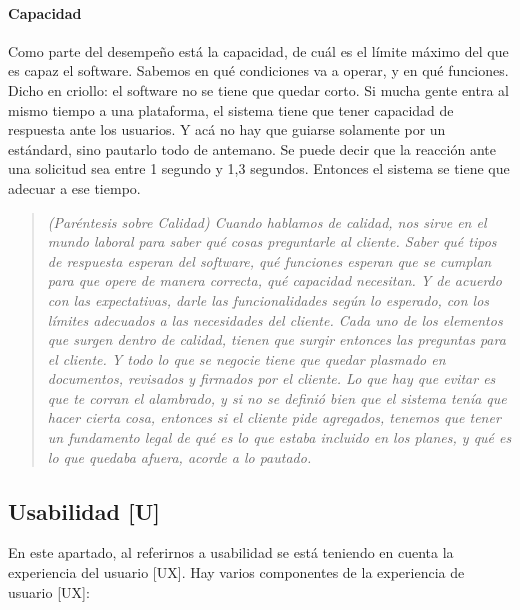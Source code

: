 \hypertarget{capacidad}{%
\paragraph{Capacidad}\label{capacidad}}

Como parte del desempeño está la capacidad, de cuál es el límite máximo
del que es capaz el software. Sabemos en qué condiciones va a operar, y
en qué funciones. Dicho en criollo: el software no se tiene que quedar
corto. Si mucha gente entra al mismo tiempo a una plataforma, el sistema
tiene que tener capacidad de respuesta ante los usuarios. Y acá no hay
que guiarse solamente por un estándard, sino pautarlo todo de antemano.
Se puede decir que la reacción ante una solicitud sea entre 1 segundo y
1,3 segundos. Entonces el sistema se tiene que adecuar a ese tiempo.

\begin{quote}
{\slshape
(Paréntesis sobre Calidad) Cuando hablamos de calidad, nos sirve en el
mundo laboral para saber qué cosas preguntarle al cliente. Saber qué
tipos de respuesta esperan del software, qué funciones esperan que se
cumplan para que opere de manera correcta, qué capacidad necesitan. Y de
acuerdo con las expectativas, darle las funcionalidades según lo
esperado, con los límites adecuados a las necesidades del cliente. Cada
uno de los elementos que surgen dentro de calidad, tienen que surgir
entonces las preguntas para el cliente. Y todo lo que se negocie tiene
que quedar plasmado en documentos, revisados y firmados por el cliente.
Lo que hay que evitar es que te corran el alambrado, y si no se definió
bien que el sistema tenía que hacer cierta cosa, entonces si el cliente
pide agregados, tenemos que tener un fundamento legal de qué es lo que
estaba incluido en los planes, y qué es lo que quedaba afuera, acorde a
lo pautado.
}
\end{quote}

\hypertarget{usabilidad-u}{%
\subsection{Usabilidad {[}U{]}}\label{usabilidad-u}}

En este apartado, al referirnos a usabilidad se está teniendo en cuenta
la experiencia del usuario {[}UX{]}. Hay varios componentes de la
experiencia de usuario {[}UX{]}:


